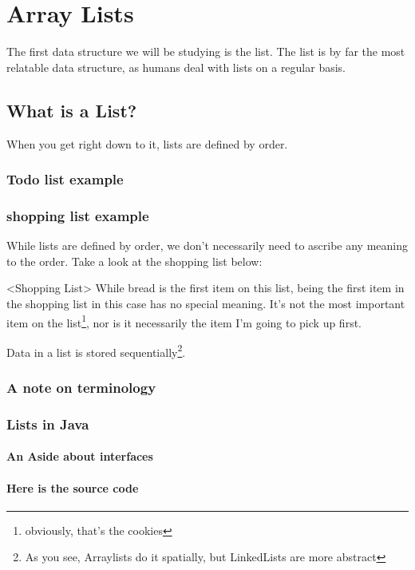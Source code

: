 

\chapter{Array Lists}
\label{chap-arraylist}

The first data structure we will be studying is the list.
The list is by far the most relatable data structure, as humans deal with lists on a regular basis.

\section{What is a List?}


When you get right down to it, lists are defined by order.


\subsection*{Todo list example}


\subsection*{shopping list example}
While lists are defined by order, we don't necessarily  need to ascribe any meaning to the order.
Take a look at the shopping list below:




<Shopping List>
While bread is the first item on this list, being the first item in the shopping list in this case has no special meaning.  It's not the most important item on the list\footnote{obviously, that's the cookies}, nor is it necessarily the item I'm going to pick up first.


Data in a list is stored sequentially\footnote{As you see, Arraylists do it spatially, but LinkedLists are more abstract}.


\subsection{A note on terminology}
\subsection{Lists in Java}
\subsubsection{An Aside about interfaces}
\subsubsection*{Here is the source code}



